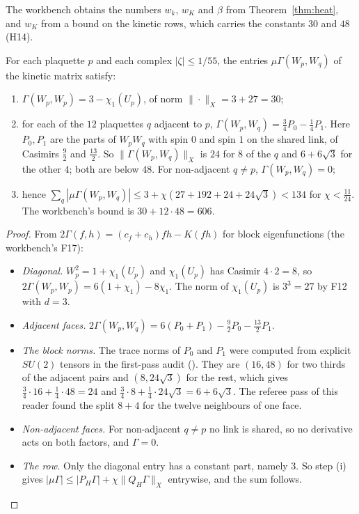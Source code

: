 The workbench obtains the numbers $w_k$, $w_K$ and $\beta$ from Theorem~\ref{thm:heat}, and $w_K$ from a bound on the kinetic rows, which carries the constants $30$ and $48$ (H14).

\begin{proposition}\label{prop:kinetic}
For each plaquette $p$ and each complex $|\zeta|\le1/55$, the entries $\mu\Gamma(W_p,W_q)$ of the kinetic matrix satisfy:
\begin{enumerate}[label=(\alph*)]
\item $\Gamma(W_p,W_p)=3-\chi_1(U_p)$, of norm $\|\cdot\|_X=3+27=30$;
\item for each of the $12$ plaquettes $q$ adjacent to $p$, $\Gamma(W_p,W_q)=\frac34P_0-\frac14P_1$. Here $P_0,P_1$ are the parts of $W_pW_q$ with spin $0$ and spin $1$ on the shared link, of Casimirs $\frac92$ and $\frac{13}2$. So $\|\Gamma(W_p,W_q)\|_X$ is $24$ for $8$ of the $q$ and $6+6\sqrt3$ for the other $4$; both are below $48$. For non-adjacent $q\ne p$, $\Gamma(W_p,W_q)=0$;
\item hence $\sum_q|\mu\Gamma(W_p,W_q)|\le3+\chi(27+192+24+24\sqrt3)<134$ for $\chi<\frac{11}{24}$. The workbench's bound is $30+12\cdot48=606$.
\end{enumerate}
\end{proposition}
\begin{proof}
From $2\Gamma(f,h)=(c_f+c_h)fh-K(fh)$ for block eigenfunctions (the workbench's F17):
\begin{itemize}
\item \emph{Diagonal.} $W_p^2=1+\chi_1(U_p)$ and $\chi_1(U_p)$ has Casimir $4\cdot2=8$, so $2\Gamma(W_p,W_p)=6(1+\chi_1)-8\chi_1$. The norm of $\chi_1(U_p)$ is $3^3=27$ by F12 with $d=3$.
\item \emph{Adjacent faces.} $2\Gamma(W_p,W_q)=6(P_0+P_1)-\frac92P_0-\frac{13}2P_1$.
\item \emph{The block norms.} The trace norms of $P_0$ and $P_1$ were computed from explicit $SU(2)$ tensors in the first-pass audit (). They are $(16,48)$ for two thirds of the adjacent pairs and $(8,24\sqrt3)$ for the rest, which gives $\frac34\cdot16+\frac14\cdot48=24$ and $\frac34\cdot8+\frac14\cdot24\sqrt3=6+6\sqrt3$. The referee pass of this reader found the split $8+4$ for the twelve neighbours of one face.
\item \emph{Non-adjacent faces.} For non-adjacent $q\ne p$ no link is shared, so no derivative acts on both factors, and $\Gamma=0$.
\item \emph{The row.} Only the diagonal entry has a constant part, namely $3$. So step (i) gives $|\mu\Gamma|\le|P_H\Gamma|+\chi\|Q_H\Gamma\|_X$ entrywise, and the sum follows.
\end{itemize}
\end{proof}
